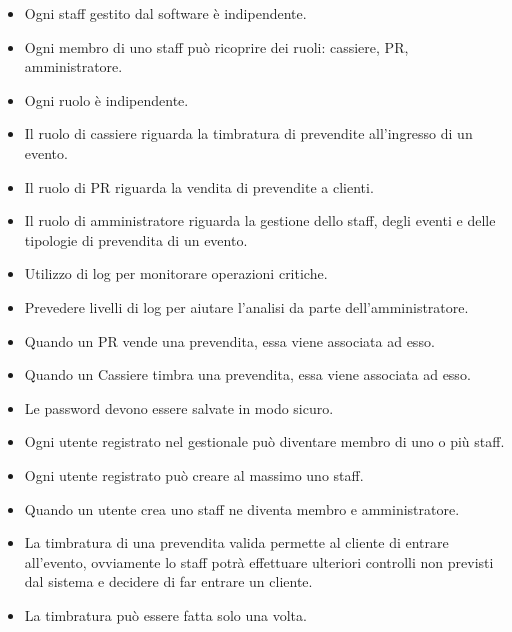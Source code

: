 \documentclass[a4paper]{article}
\begin{document}
\begin{itemize}
	\item Ogni staff gestito dal software è indipendente.
	
	\item Ogni membro di uno staff può ricoprire dei ruoli: cassiere, PR, amministratore.
	
	\item Ogni ruolo è indipendente.
	
	\item Il ruolo di cassiere riguarda la timbratura di prevendite all'ingresso di un evento.
	\item Il ruolo di PR riguarda la vendita di prevendite a clienti.
	\item Il ruolo di amministratore riguarda la gestione dello staff, degli eventi e delle tipologie di prevendita di un evento.
	
	\item Utilizzo di log per monitorare operazioni critiche.
	\item Prevedere livelli di log per aiutare l'analisi da parte dell'amministratore.
	
	\item Quando un PR vende una prevendita, essa viene associata ad esso.
	\item Quando un Cassiere timbra una prevendita, essa viene associata ad esso.
	
	\item Le password devono essere salvate in modo sicuro.
	
	
	
	\item Ogni utente registrato nel gestionale può diventare membro di uno o più staff. 
	\item Ogni utente registrato può creare al massimo uno staff.
	\item Quando un utente crea uno staff ne diventa membro e amministratore.
	
	\item La timbratura di una prevendita valida permette al cliente di entrare all'evento, ovviamente lo staff potrà effettuare ulteriori controlli non previsti dal sistema e decidere di far entrare un cliente.
	\item La timbratura può essere fatta solo una volta.
	

\end{itemize}
\end{document}
